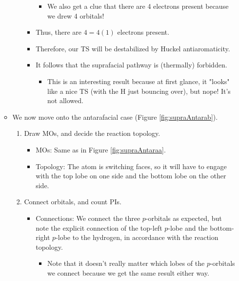 \documentclass[../notes.tex]{subfiles}
\begin{document}
\begin{itemize}
\begin{itemize}
\begin{enumerate}
\begin{itemize}
                \begin{itemize}
                    \item We also get a clue that there are 4 electrons present because we drew 4 orbitals!
                \end{itemize}
                \item Thus, there are $4=4(1)$ electrons present.
                \item Therefore, our TS will be destabilized by Huckel antiaromaticity.
                \item It follows that the suprafacial pathway is (thermally) forbidden.
                \begin{itemize}
                    \item This is an interesting result because at first glance, it "looks" like a nice TS (with the H just bouncing over), but nope! It's not allowed.
                \end{itemize}
            \end{itemize}
        \end{enumerate}
        \pagebreak
        \item We now move onto the antarafacial case (Figure \ref{fig:supraAntarab}).
        \begin{enumerate}
            \item Draw MOs, and decide the reaction topology.
            \begin{itemize}
                \item MOs: Same as in Figure \ref{fig:supraAntaraa}.
                \item Topology: The  atom is switching faces, so it will have to engage with the top lobe on one side and the bottom lobe on the other side.
            \end{itemize}
            \item Connect orbitals, and count PIs.
            \begin{itemize}
                \item Connections: We connect the three $p$-orbitals as expected, but note the explicit connection of the top-left $p$-lobe and the bottom-right $p$-lobe to the hydrogen, in accordance with the reaction topology.
                \begin{itemize}
                    \item Note that it doesn't really matter which lobes of the $p$-orbitals we connect because we get the same result either way.
                \end{itemize}

\end{itemize}
\end{enumerate}
\end{itemize}
\end{itemize}
\end{document}
